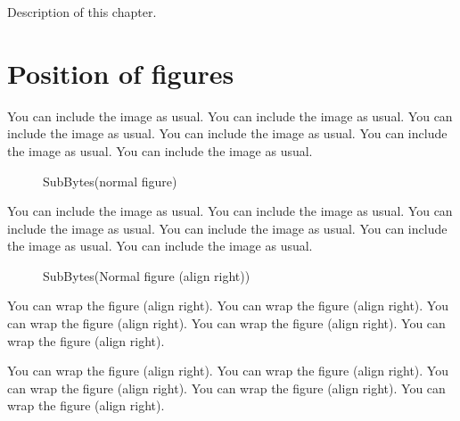 Description of this chapter.

\section{Position of figures}
\label{section:1.1}
You can include the image as usual. You can include the image as usual.
You can include the image as usual. You can include the image as usual.
You can include the image as usual. You can include the image as usual.

\begin{figure}[ht]
\caption{SubBytes(normal figure)} \label{fig:1}
\end{figure}

You can include the image as usual. You can include the image as usual.
You can include the image as usual. You can include the image as usual.
You can include the image as usual. You can include the image as usual.

\begin{figure}
\caption{SubBytes(Normal figure (align right))} \label{fig:2}
\end{figure}

You can wrap the figure (align right). You can wrap the figure (align 
right). You can wrap the figure (align right). You can wrap the figure
(align right). You can wrap the figure (align right).

You can wrap the figure (align right). You can wrap the figure (align 
right). You can wrap the figure (align right). You can wrap the figure
(align right). You can wrap the figure (align right).

